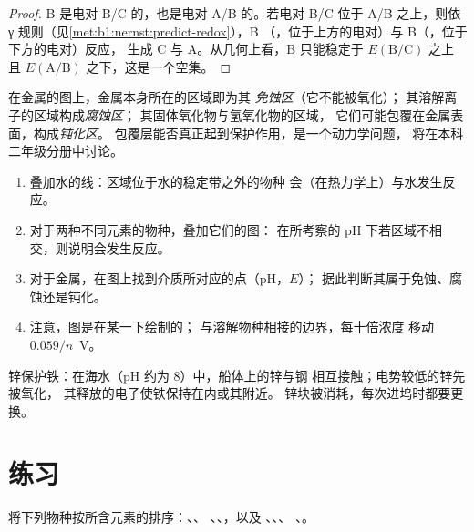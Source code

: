\begin{proof}
B 是电对 B/C 的，也是电对 A/B 的。若电对 B/C 位于
A/B 之上，则依 γ 规则（见\cref{met:b1:nernst:predict-redox}），B
（，位于上方的电对）与 B（，位于下方的电对）反应，
生成 C 与 A。从几何上看，B 只能稳定于 $E(\mathrm{B}/\mathrm{C})$ 之上
且 $E(\mathrm{A}/\mathrm{B})$ 之下，这是一个空集。
\end{proof}

\begin{definition}\label{def:b1:e-ph-diagrams:corrosion-domains}
在金属的图上，金属本身所在的区域即为其
\emph{免蚀区}（它不能被氧化）；
其溶解离子的区域构成\emph{腐蚀区}；
其固体氧化物与氢氧化物的区域，
它们可能包覆在金属表面，构成\emph{钝化区}。
包覆层能否真正起到保护作用，是一个动力学问题，
将在本科二年级分册中讨论。
\end{definition}

\begin{method}[读图方法]\label{met:b1:e-ph-diagrams:read}
\begin{enumerate}
  \item 叠加水的线：区域位于水的稳定带之外的物种
        会（在热力学上）与水发生反应。
  \item 对于两种不同元素的物种，叠加它们的图：
        在所考察的 pH 下若区域不相交，则说明会发生反应。
  \item 对于金属，在图上找到介质所对应的点（pH，$E$）；
        据此判断其属于免蚀、腐蚀还是钝化。
  \item 注意，图是在某一下绘制的；
        与溶解物种相接的边界，每十倍浓度
        移动 $0.059/n$~V。
\end{enumerate}
\end{method}

锌保护铁：在海水（pH 约为 8）中，船体上的锌与钢
相互接触；电势较低的锌先被氧化，
其释放的电子使铁保持在内或其附近。
锌块被消耗，每次进坞时都要更换。

\section{练习}

\begin{exercise}[$\star$]\label{exo:b1:e-ph-diagrams:1}
将下列物种按所含元素的排序：、、
、、，以及 、、、
、。
\end{exercise}

